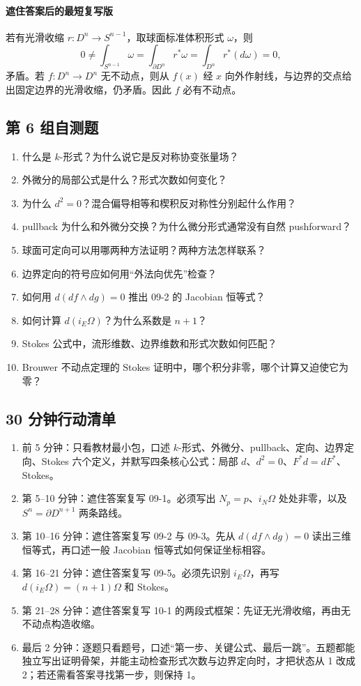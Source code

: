 \documentclass[12pt,a4paper]{ctexart}
\begin{document}
\paragraph{遮住答案后的最短复写版}
若有光滑收缩 $r:D^n\to S^{n-1}$，取球面标准体积形式 $\omega$，则
\[
  0\ne\int_{S^{n-1}}\omega
  =\int_{\partial D^n}r^*\omega
  =\int_{D^n}r^*(d\omega)=0,
\]
矛盾。若 $f:D^n\to D^n$ 无不动点，则从 $f(x)$ 经 $x$ 向外作射线，与边界的交点给出固定边界的光滑收缩，仍矛盾。因此 $f$ 必有不动点。

\subsection*{第 6 组自测题}

\begin{enumerate}
  \item 什么是 $k$-形式？为什么说它是反对称协变张量场？
  \item 外微分的局部公式是什么？形式次数如何变化？
  \item 为什么 $d^2=0$？混合偏导相等和楔积反对称性分别起什么作用？
  \item pullback 为什么和外微分交换？为什么微分形式通常没有自然 pushforward？
  \item 球面可定向可以用哪两种方法证明？两种方法怎样联系？
  \item 边界定向的符号应如何用“外法向优先”检查？
  \item 如何用 $d(df\wedge dg)=0$ 推出 09-2 的 Jacobian 恒等式？
  \item 如何计算 $d(i_E\Omega)$？为什么系数是 $n+1$？
  \item Stokes 公式中，流形维数、边界维数和形式次数如何匹配？
  \item Brouwer 不动点定理的 Stokes 证明中，哪个积分非零，哪个计算又迫使它为零？
\end{enumerate}

\subsection*{30 分钟行动清单}

\begin{enumerate}
  \item 前 5 分钟：只看教材最小包，口述 $k$-形式、外微分、pullback、定向、边界定向、Stokes 六个定义，并默写四条核心公式：局部 $d$、$d^2=0$、$F^*d=dF^*$、Stokes。
  \item 第 5--10 分钟：遮住答案复写 09-1。必须写出 $N_p=p$、$i_N\Omega$ 处处非零，以及 $S^n=\partial D^{n+1}$ 两条路线。
  \item 第 10--16 分钟：遮住答案复写 09-2 与 09-3。先从 $d(df\wedge dg)=0$ 读出三维恒等式，再口述一般 Jacobian 恒等式如何保证坐标相容。
  \item 第 16--21 分钟：遮住答案复写 09-5。必须先识别 $i_E\Omega$，再写 $d(i_E\Omega)=(n+1)\Omega$ 和 Stokes。
  \item 第 21--28 分钟：遮住答案复写 10-1 的两段式框架：先证无光滑收缩，再由无不动点构造收缩。
  \item 最后 2 分钟：逐题只看题号，口述“第一步、关键公式、最后一跳”。五题都能独立写出证明骨架，并能主动检查形式次数与边界定向时，才把状态从 1 改成 2；若还需看答案寻找第一步，则保持 1。
\end{enumerate}
\end{document}
